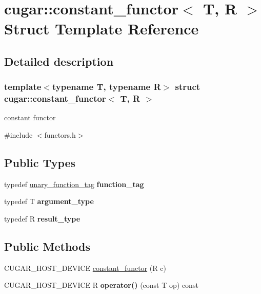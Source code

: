 \hypertarget{structcugar_1_1constant__functor}{}\section{cugar\+:\+:constant\+\_\+functor$<$ T, R $>$ Struct Template Reference}
\label{structcugar_1_1constant__functor}


\subsection{Detailed description}
\subsubsection*{template$<$typename T, typename R$>$\newline
struct cugar\+::constant\+\_\+functor$<$ T, R $>$}

constant functor 

{\ttfamily \#include $<$functors.\+h$>$}

\subsection*{Public Types}
\begin{DoxyCompactItemize}
\item 
\mbox{\label{structcugar_1_1constant__functor_aa17f4bf4ea8666209fbd8d769bc10ca4}} 
typedef \hyperlink{structcugar_1_1unary__function__tag}{unary\+\_\+function\+\_\+tag} {\bfseries function\+\_\+tag}
\item 
\mbox{\label{structcugar_1_1constant__functor_ae385ab77856734935f420ebfd0c94e94}} 
typedef T {\bfseries argument\+\_\+type}
\item 
\mbox{\label{structcugar_1_1constant__functor_aa242851b82c2bb7db852ffbde278b7d1}} 
typedef R {\bfseries result\+\_\+type}
\end{DoxyCompactItemize}
\subsection*{Public Methods}
\begin{DoxyCompactItemize}
\item 
C\+U\+G\+A\+R\+\_\+\+H\+O\+S\+T\+\_\+\+D\+E\+V\+I\+CE \hyperlink{structcugar_1_1constant__functor_afc17d92554197c5286554135c3cdc006}{constant\+\_\+functor} (R c)
\item 
\mbox{\label{structcugar_1_1constant__functor_a547f882068d2f140fd00b3bc75d645b5}} 
C\+U\+G\+A\+R\+\_\+\+H\+O\+S\+T\+\_\+\+D\+E\+V\+I\+CE R {\bfseries operator()} (const T op) const
\end{DoxyCompactItemize}

